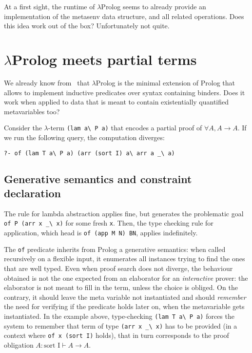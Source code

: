 \documentclass{easychair}
\begin{document}
At a first sight, the runtime of $\lambda$Prolog seems to already provide
an implementation of the metasenv data structure, and all related operations.
Does this idea work out of the box? Unfortunately not quite.

\section{$\lambda$Prolog meets partial terms}

We already know from~\cite{jlp98} that $\lambda$Prolog is the minimal
extension of Prolog that allows to implement inductive predicates over
syntax containing binders. Does it work when applied to data that is
meant to contain existentially quantified metavariables too?

Consider the $\lambda$-term \verb+(lam a\ P a)+ that encodes a
partial proof of $\forall A, A \to A$.
If we run the following query, the computation diverges:

\begin{verbatim}
?- of (lam T a\ P a) (arr (sort I) a\ arr a _\ a)
\end{verbatim}

\subsection{Generative semantics and constraint declaration} %
\label{sec:delay}

The rule for lambda abstraction applies fine, but generates the problematic
goal \verb+of P (arr x _\ x)+ for some fresh \verb+x+.  Then, the type checking
rule for application, which head is \verb+of (app M N) BN+, applies
indefinitely.  

The \verb+of+ predicate inherits from Prolog a generative semantics:
when called recursively on a flexible input, it enumerates all
instances trying to find the ones that are well typed. Even when proof
search does not diverge, the behaviour obtained is not the one
expected from an elaborator for an \emph{interactive} prover: the
elaborator is not meant to fill in the term, unless the choice is
obliged. On the contrary, it should leave the meta variable not
instantiated and should \emph{remember} the need for verifying if the
predicate holds later on, when the metavariable gets instantiated. In
the example above, type-checking \verb+(lam T a\ P a)+ forces the
system to remember that term of type \verb+(arr x _\ x)+ has to be
provided (in a context where \verb+of x (sort I)+ holds), that in turn
corresponds to the proof obligation $A : \mbox{sort I} \vdash A \to A $.
\end{document}
